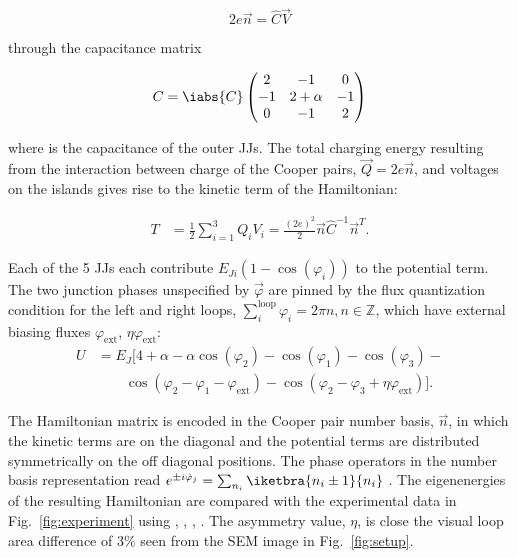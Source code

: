 \begin{equation}
  \label{eq:link}
  2e\vec{n} = \hat{C}\vec{V}
\end{equation}

\noindent through the capacitance matrix

\begin{equation}
  \label{eq:capac}
  C = \iabs{C} \begin{pmatrix}
    2  &  -1  &  0\\
    -1  &  2  +  \alpha  &  -1\\
    0  &  -1  & 2
  \end{pmatrix}
\end{equation}

\noindent where   is  the capacitance  of the  outer JJs.   The total  charging energy
resulting from the interaction between charge of  the Cooper pairs, $ \vec{Q}=2e\vec{n} $, and
voltages on the islands gives rise to the kinetic term of the Hamiltonian:

\begin{equation}\label{eq:kinetic}
  \begin{aligned}
    T & = \frac{1}{2}\sum_{i=1}^{3}Q_iV_i = \frac{(2e)^2}{2}\vec{n}\hat{C}^{-1}\vec{n}^{T}.
  \end{aligned}
\end{equation}


Each of the 5 JJs each contribute $  E_{Ji}\left(1 - \cos(\varphi_i)\right) $ to the potential term.
The  two junction  phases unspecified  by $  \vec{\varphi}  $ are  pinned by  the flux  quantization
condition          for          the           left          and          right          loops,
$  \sum_{i}^{\text{loop}} \varphi_i  =  2\pi n,  n  \in  \mathbb{Z}$, which  have  external biasing  fluxes
$ \varphi_\text{ext} $, $ \eta\varphi_\text{ext} $:
\begin{equation}\label{eq:potential}
  \begin{aligned}
    U & = E_J\big[4 + \alpha - \alpha\cos(\varphi_{2}) -\cos(\varphi_{1}) -\cos(\varphi_{3}) - \\
    & \qquad \cos(\varphi_{2} - \varphi_{1} - \varphi_{\text{ext}}) - \cos(\varphi_{2} - \varphi_{3} + \eta\varphi_{\text{ext}})\big].
  \end{aligned}
\end{equation}

The Hamiltonian matrix  is encoded in the Cooper  pair number basis, $\vec{n} $,  in which the
kinetic terms are on the diagonal and the potential terms are distributed symmetrically on the
off  diagonal  positions.   The  phase  operators in  the  number  basis  representation  read
$ e^{\pm i\hat{\varphi}_j} = \sum_{n_i}\iketbra{n_i\pm1}{n_i}$  \cite{phase}.  The eigenenergies of the
resulting Hamiltonian  are compared  with the  experimental data  in Fig.~\ref{fig:experiment}
using  , ,  , .  The asymmetry value, $ \eta $, is  close the visual loop area difference of 3\% seen
from the SEM image in Fig.~\ref{fig:setup}.
 
